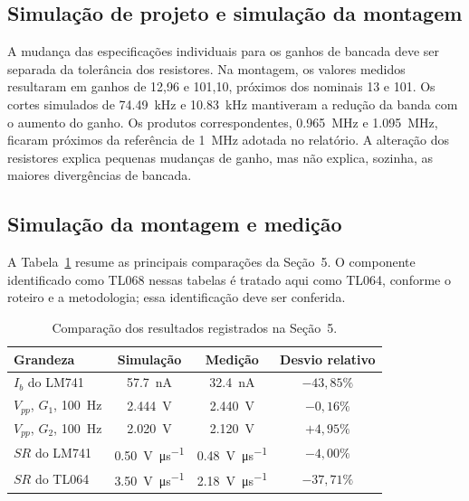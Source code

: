 \documentclass[11pt,a4paper]{article}
\begin{document}
\subsection{Simulação de projeto e simulação da montagem}

A mudança das especificações individuais para os ganhos de bancada deve ser separada da tolerância dos resistores. Na montagem, os valores medidos resultaram em ganhos de 12,96 e 101,10, próximos dos nominais 13 e 101. Os cortes simulados de \SI{74,49}{\kilo\hertz} e \SI{10,83}{\kilo\hertz} mantiveram a redução da banda com o aumento do ganho. Os produtos correspondentes, \SI{0,965}{\mega\hertz} e \SI{1,095}{\mega\hertz}, ficaram próximos da referência de \SI{1}{\mega\hertz} adotada no relatório. A alteração dos resistores explica pequenas mudanças de ganho, mas não explica, sozinha, as maiores divergências de bancada.

\subsection{Simulação da montagem e medição}

A Tabela~\ref{tab:discussao_r3} resume as principais comparações da Seção~5. O componente identificado como TL068 nessas tabelas é tratado aqui como TL064, conforme o roteiro e a metodologia; essa identificação deve ser conferida.

\begin{table}[htbp]
\centering
\caption{Comparação dos resultados registrados na Seção~5.}
\label{tab:discussao_r3}
\small
\begin{tabular}{@{}lccc@{}}
\toprule
Grandeza & Simulação & Medição & Desvio relativo \\
\midrule
$I_b$ do LM741 & \SI{57,7}{\nano\ampere} & \SI{32,4}{\nano\ampere} & $-43,85\%$ \\
$V_{pp}$, $G_1$, \SI{100}{\hertz} & \SI{2,444}{\volt} & \SI{2,440}{\volt} & $-0,16\%$ \\
$V_{pp}$, $G_2$, \SI{100}{\hertz} & \SI{2,020}{\volt} & \SI{2,120}{\volt} & $+4,95\%$ \\
$SR$ do LM741 & \SI{0,50}{\volt\per\micro\second} & \SI{0,48}{\volt\per\micro\second} & $-4,00\%$ \\
$SR$ do TL064 & \SI{3,50}{\volt\per\micro\second} & \SI{2,18}{\volt\per\micro\second} & $-37,71\%$ \\
\bottomrule
\end{tabular}
\end{table}
\end{document}
